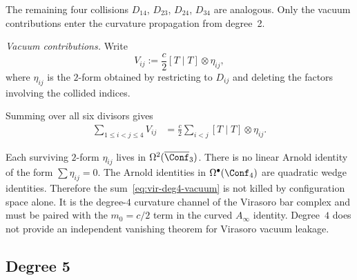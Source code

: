 \begin{computation}
The remaining four collisions $D_{14}$, $D_{23}$, $D_{24}$, $D_{34}$
are analogous. Only the vacuum contributions enter the curvature
propagation from degree~2.

\emph{Vacuum contributions.}
Write
\[
V_{ij} := \frac{c}{2} [T \mid T] \otimes \eta_{ij},
\]
where $\eta_{ij}$ is the $2$-form obtained by restricting to
$D_{ij}$ and deleting the factors involving the collided indices.

Summing over all six divisors gives
\begin{align}
\sum_{1 \leq i < j \leq 4} V_{ij}
&= \frac{c}{2} \sum_{i < j} [T \mid T] \otimes \eta_{ij}.
\label{eq:vir-deg4-vacuum}
\end{align}

Each surviving $2$-form $\eta_{ij}$ lives in $\Omega^2(\overline{\Conf}_3)$.
There is no linear Arnold identity of the form
$\sum\eta_{ij}=0$. The Arnold identities in
$\Omega^\bullet(\Conf_4)$ are quadratic wedge identities. Therefore
the sum~\eqref{eq:vir-deg4-vacuum} is not killed by configuration
space alone. It is the degree-$4$ curvature channel of the Virasoro
bar complex and must be paired with the $m_0=c/2$ term in the curved
$A_\infty$ identity. Degree~$4$ does not provide an independent
vanishing theorem for Virasoro vacuum leakage.
\end{computation}

\subsection{Degree 5}

